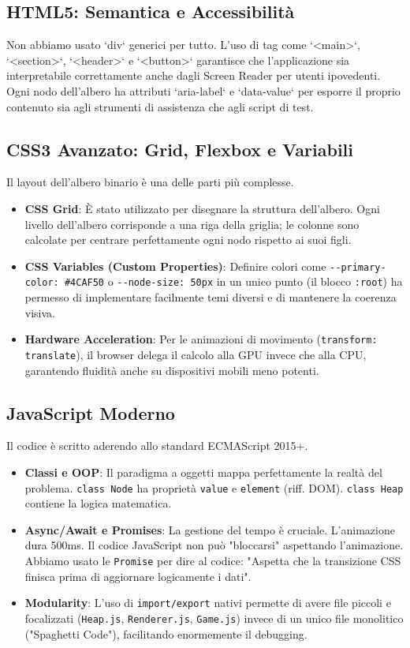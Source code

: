 \documentclass[openany]{theme/uniprthesis}
\begin{document}
\subsection{HTML5: Semantica e Accessibilità}
Non abbiamo usato `div` generici per tutto. L'uso di tag come `<main>`, `<section>`, `<header>` e `<button>` garantisce che l'applicazione sia interpretabile correttamente anche dagli Screen Reader per utenti ipovedenti. Ogni nodo dell'albero ha attributi `aria-label` e `data-value` per esporre il proprio contenuto sia agli strumenti di assistenza che agli script di test.

\subsection{CSS3 Avanzato: Grid, Flexbox e Variabili}
Il layout dell'albero binario è una delle parti più complesse.
\begin{itemize}
    \item \textbf{CSS Grid}: È stato utilizzato per disegnare la struttura dell'albero. Ogni livello dell'albero corrisponde a una riga della griglia; le colonne sono calcolate per centrare perfettamente ogni nodo rispetto ai suoi figli.
    \item \textbf{CSS Variables (Custom Properties)}: Definire colori come \texttt{-{}-primary-color: \#4CAF50} o \texttt{-{}-node-size: 50px} in un unico punto (il blocco \texttt{:root}) ha permesso di implementare facilmente temi diversi e di mantenere la coerenza visiva.
    \item \textbf{Hardware Acceleration}: Per le animazioni di movimento (\texttt{transform: translate}), il browser delega il calcolo alla GPU invece che alla CPU, garantendo fluidità anche su dispositivi mobili meno potenti.
\end{itemize}

\subsection{JavaScript Moderno}
Il codice è scritto aderendo allo standard ECMAScript 2015+.
\begin{itemize}
    \item \textbf{Classi e OOP}: Il paradigma a oggetti mappa perfettamente la realtà del problema. \texttt{class Node} ha proprietà \texttt{value} e \texttt{element} (riff. DOM). \texttt{class Heap} contiene la logica matematica.
    \item \textbf{Async/Await e Promises}: La gestione del tempo è cruciale. L'animazione dura 500ms. Il codice JavaScript non può "bloccarsi" aspettando l'animazione. Abbiamo usato le \texttt{Promise} per dire al codice: "Aspetta che la transizione CSS finisca prima di aggiornare logicamente i dati".
    \item \textbf{Modularity}: L'uso di \texttt{import/export} nativi permette di avere file piccoli e focalizzati (\texttt{Heap.js}, \texttt{Renderer.js}, \texttt{Game.js}) invece di un unico file monolitico ("Spaghetti Code"), facilitando enormemente il debugging.
\end{itemize}
\end{document}
